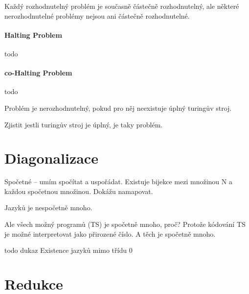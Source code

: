Každý rozhodnutelný problém je současně částečně rozhodnutelný, ale některé nerozhodnutelné problémy nejsou ani částečně rozhodnutelné.

\paragraph*{Halting Problem} todo

\paragraph*{co-Halting Problem} todo

Problém je nerozhodnutelný, pokud pro něj neexistuje úplný turingův stroj.

Zjistit jestli turingův stroj je úplný, je taky problém.


\section{Diagonalizace}

Spočetné -- umím spočítat a uspořádat. Existuje bijekce mezi množinou N a každou spočetnou množinou. Dokážu namapovat.

Jazyků je nespočetně mnoho.

Ale všech možný programů (TS) je spočetně mnoho, proč? Protože kódování TS je možné interpretovat jako přirozené číslo. A těch je spočetně mnoho.


todo dukaz Existence jazyků mimo třídu 0


\section{Redukce}

